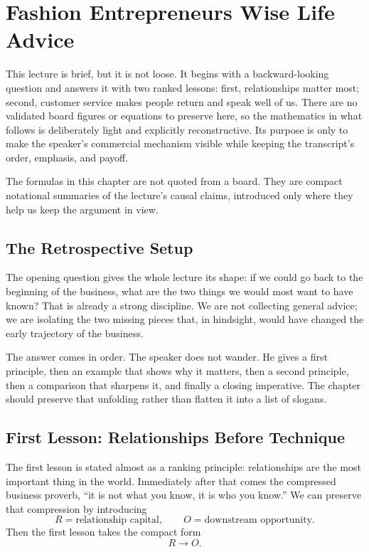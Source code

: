 \chapter{Fashion Entrepreneurs Wise Life Advice}

This lecture is brief, but it is not loose. It begins with a backward-looking question and answers it with two ranked lessons: first, relationships matter most; second, customer service makes people return and speak well of us. There are no validated board figures or equations to preserve here, so the mathematics in what follows is deliberately light and explicitly reconstructive. Its purpose is only to make the speaker's commercial mechanism visible while keeping the transcript's order, emphasis, and payoff.

\begin{remark}
The formulas in this chapter are not quoted from a board. They are compact notational summaries of the lecture's causal claims, introduced only where they help us keep the argument in view.
\end{remark}

\section{The Retrospective Setup}

The opening question gives the whole lecture its shape: if we could go back to the beginning of the business, what are the two things we would most want to have known? That is already a strong discipline. We are not collecting general advice; we are isolating the two missing pieces that, in hindsight, would have changed the early trajectory of the business.

The answer comes in order. The speaker does not wander. He gives a first principle, then an example that shows why it matters, then a second principle, then a comparison that sharpens it, and finally a closing imperative. The chapter should preserve that unfolding rather than flatten it into a list of slogans.

\section{First Lesson: Relationships Before Technique}

The first lesson is stated almost as a ranking principle: relationships are the most important thing in the world. Immediately after that comes the compressed business proverb, ``it is not what you know, it is who you know.'' We can preserve that compression by introducing
\[
R = \text{relationship capital},
\qquad
O = \text{downstream opportunity}.
\]
Then the first lesson takes the compact form
\begin{equation}
R \to O.
\end{equation}

